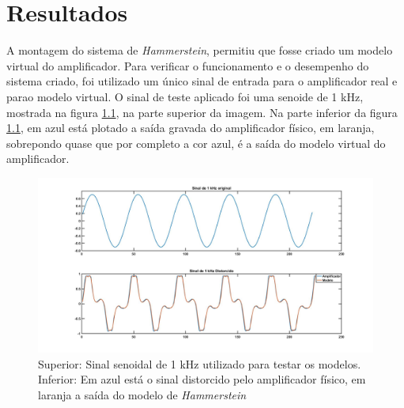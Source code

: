\chapter{Resultados}




A montagem do sistema de \textit{Hammerstein}, permitiu que fosse criado um modelo virtual do amplificador. Para verificar o funcionamento e o desempenho do sistema criado, foi utilizado um único sinal de entrada para o amplificador real e parao modelo virtual. O sinal de teste aplicado foi uma senoide de 1 kHz, mostrada na figura \ref{fig:tccfig}, na parte superior da imagem. Na parte inferior da figura \ref{fig:tccfig}, em azul está plotado a saída gravada do amplificador físico, em laranja, sobrepondo quase que por completo a cor azul, é a saída do modelo virtual do amplificador.

\begin{figure}
	\centering
	\includegraphics[width=1\linewidth]{figuras/TCC_fig}
	\caption{Superior: Sinal senoidal de 1 kHz utilizado para testar os modelos. Inferior: Em azul está o sinal distorcido pelo amplificador físico, em laranja a saída do modelo de \textit{Hammerstein}}
	\label{fig:tccfig}
\end{figure}

